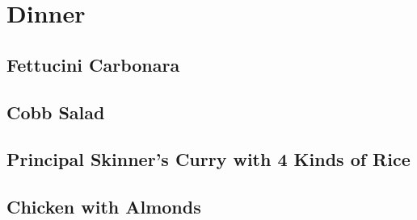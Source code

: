 \newcommand*{\DinnerPath}{\RecipesPath/dinner}%

\chapter{Dinner}
  \clearpage
  
  \clearpage
  
  \clearpage
  
  \clearpage
  
  \clearpage
  
  \clearpage
  
  \clearpage
  
  \clearpage
  
  \clearpage
  
  \clearpage
  
  \clearpage
  
  \clearpage
  
  \clearpage
  
  \clearpage
  
  \clearpage
  
  \clearpage
  
  \clearpage
  
  \clearpage
  
  \clearpage
  
  \clearpage
  
  \clearpage
  
  \clearpage
  
  \clearpage
  
  \clearpage
  
  \clearpage
  
  \clearpage
  
  \clearpage
  
  \clearpage
  
  \clearpage
  \section{Fettucini Carbonara}
  \section{Cobb Salad}
  \section{Principal Skinner's Curry with 4 Kinds of Rice}
  \section{Chicken with Almonds}
